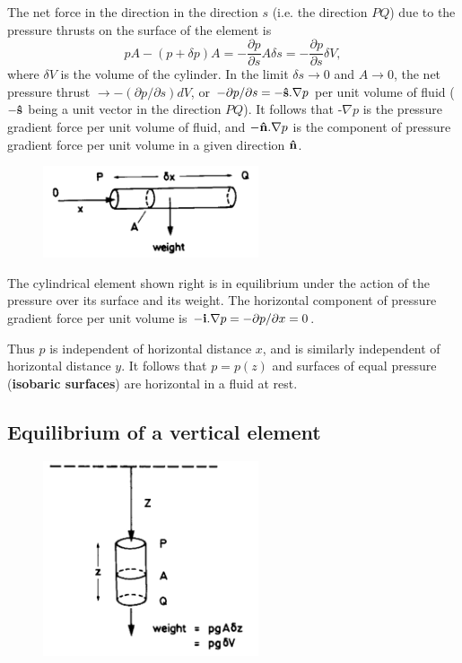 \documentclass[10pt]{report}
\begin{document}
The net force in the direction in the direction $s$ (i.e. the direction $PQ$)
due to the pressure thrusts on the surface of the element is
\[
pA-(p+\delta p)A=-\frac{\partial p}{\partial
s}A\delta s=-\frac{\partial p}{\partial s}\delta V,
\]
where $\delta V$ is the volume of the cylinder. In the limit $\delta s \to
 0$ and $A \to  0$, the net pressure thrust $\to -(\partial
p/\partial s)dV$, or $-\partial p/\partial
s=-{\bf \hat {s}}. \nabla p$ per unit volume of
fluid ($-{{\bf \hat {s}}}$ being a unit vector in the direction $PQ$). It
follows that -$\nabla p$ is the pressure gradient force per unit volume of
fluid, and $-{{\bf \hat {n}}}. \nabla p$ is the component of
pressure gradient force per unit volume in a given direction ${{\bf \hat
{n}}}$.

\begin{figure}
\centerline{\includegraphics[width=2.5in]{Section26.pdf}}
\label{fig2.6}
\caption{ }
\end{figure}

The cylindrical element shown right is in equilibrium under the action of
the pressure over its surface and its weight. The horizontal component of
pressure gradient force per unit volume is $-{{\bf i}}.
\nabla p=-\partial p/\partial x=0$.

Thus $p$ is independent of horizontal distance $x$, and is similarly independent
of horizontal distance $y$. It follows that $p = p(z)$ and surfaces of equal
pressure (\textbf{isobaric surfaces}) are horizontal in a fluid at rest.

\subsection{Equilibrium of a vertical element}

\begin{figure}
\centerline{\includegraphics[width=2.5in]{Section27.pdf}}
\label{fig2.7}
\caption{ }
\end{figure}
\end{document}
